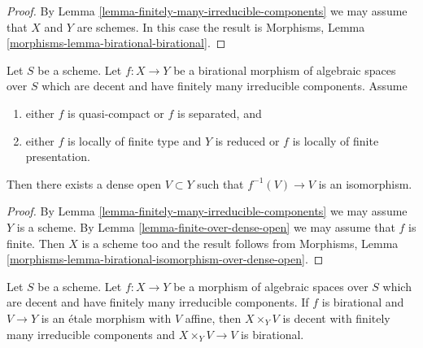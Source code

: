 \begin{proof}
By Lemma \ref{lemma-finitely-many-irreducible-components} we may assume
that $X$ and $Y$ are schemes. In this case the result is
Morphisms, Lemma \ref{morphisms-lemma-birational-birational}.
\end{proof}

\begin{lemma}
\label{lemma-birational-isomorphism-over-dense-open}
Let $S$ be a scheme. Let $f : X \to Y$ be a birational morphism of
algebraic spaces over $S$ which are decent and have finitely
many irreducible components. Assume
\begin{enumerate}
\item either $f$ is quasi-compact or $f$ is separated, and
\item either $f$ is locally of finite type and $Y$ is reduced or
$f$ is locally of finite presentation.
\end{enumerate}
Then there exists a dense open $V \subset Y$
such that $f^{-1}(V) \to V$ is an isomorphism.
\end{lemma}

\begin{proof}
By Lemma \ref{lemma-finitely-many-irreducible-components} we may assume
$Y$ is a scheme. By Lemma \ref{lemma-finite-over-dense-open} we may assume
that $f$ is finite. Then $X$ is a scheme too and the result follows from
Morphisms, Lemma \ref{morphisms-lemma-birational-isomorphism-over-dense-open}.
\end{proof}

\begin{lemma}
\label{lemma-birational-etale-localization}
Let $S$ be a scheme. Let $f : X \to Y$ be a morphism of algebraic
spaces over $S$ which are decent and have finitely many irreducible
components. If $f$ is birational and $V \to Y$ is an \'etale morphism
with $V$ affine, then $X \times_Y V$ is decent with finitely
many irreducible components and $X \times_Y V \to V$ is birational.
\end{lemma}

